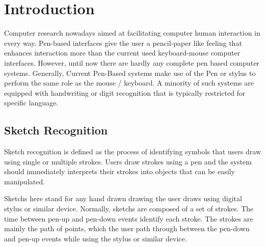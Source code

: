 \chapter {Introduction}

Computer research nowadays aimed at facilitating computer human interaction in every way. Pen-based interfaces give the user a pencil-paper like feeling that enhances interaction more than the current used keyboard-mouse computer interfaces. However, until now there are hardly any complete pen based computer systems. Generally, Current Pen-Based systems make use of the Pen or stylus to perform the same role as the mouse / keyboard. A minority of such systems are equipped with handwriting or digit recognition that is typically restricted for specific language. 

\section{Sketch Recognition}
Sketch recognition is defined as the process of identifying symbols that users draw using single or multiple strokes. Users draw strokes using a pen and the system should immediately interprets their strokes into objects that can be easily manipulated.

Sketchs here stand for any hand drawn drawing the user draws using digital stylus or similar device. Normally, sketchs are composed of a set of strokes. The time between pen-up and pen-down events identify each stroke. The strokes are mainly the path of points, which the user path through between the pen-down and pen-up events while using the stylus or similar device. 

 
 
